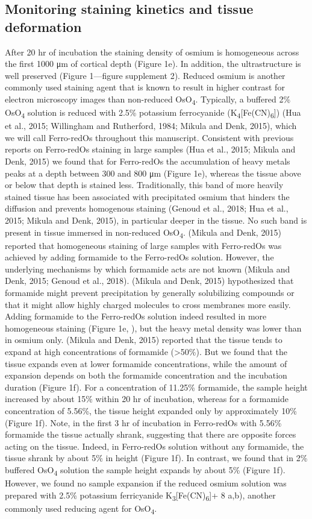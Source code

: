 \documentclass{article}
\begin{document}
\subsection*{Monitoring staining kinetics and tissue deformation}
After 20 hr of incubation the staining density of osmium is homogeneous across the first 1000 μm of cortical depth (Figure 1e). In addition, the ultrastructure is well preserved (Figure 1—figure supplement 2). Reduced osmium is another commonly used staining agent that is known to result in higher contrast for electron microscopy images than non-reduced OsO\textsubscript{4}. Typically, a buffered 2\% OsO\textsubscript{4} solution is reduced with 2.5\% potassium ferrocyanide (K\textsubscript{4}[Fe(CN)\textsubscript{6}]) (Hua et al., 2015; Willingham and Rutherford, 1984; Mikula and Denk, 2015), which we will call Ferro-redOs throughout this manuscript. Consistent with previous reports on Ferro-redOs staining in large samples (Hua et al., 2015; Mikula and Denk, 2015) we found that for Ferro-redOs the accumulation of heavy metals peaks at a depth between 300 and 800 μm (Figure 1e), whereas the tissue above or below that depth is stained less. Traditionally, this band of more heavily stained tissue has been associated with precipitated osmium that hinders the diffusion and prevents homogenous staining (Genoud et al., 2018; Hua et al., 2015; Mikula and Denk, 2015), in particular deeper in the tissue. No such band is present in tissue immersed in non-reduced OsO\textsubscript{4}. (Mikula and Denk, 2015) reported that homogeneous staining of large samples with Ferro-redOs was achieved by adding formamide to the Ferro-redOs solution. However, the underlying mechanisms by which formamide acts are not known (Mikula and Denk, 2015; Genoud et al., 2018). (Mikula and Denk, 2015) hypothesized that formamide might prevent precipitation by generally solubilizing compounds or that it might allow highly charged molecules to cross membranes more easily. Adding formamide to the Ferro-redOs solution indeed resulted in more homogeneous staining (Figure 1e, ), but the heavy metal density was lower than in osmium only. (Mikula and Denk, 2015) reported that the tissue tends to expand at high concentrations of formamide (>50\%). But we found that the tissue expands even at lower formamide concentrations, while the amount of expansion depends on both the formamide concentration and the incubation duration (Figure 1f). For a concentration of 11.25\% formamide, the sample height increased by about 15\% within 20 hr of incubation, whereas for a formamide concentration of 5.56\%, the tissue height expanded only by approximately 10\% (Figure 1f). Note, in the first 3 hr of incubation in Ferro-redOs with 5.56\% formamide the tissue actually shrank, suggesting that there are opposite forces acting on the tissue. Indeed, in Ferro-redOs solution without any formamide, the tissue shrank by about 5\% in height (Figure 1f). In contrast, we found that in 2\% buffered OsO\textsubscript{4} solution the sample height expands by about 5\% (Figure 1f). However, we found no sample expansion if the reduced osmium solution was prepared with 2.5\% potassium ferricyanide K\textsubscript{3}[Fe(CN)\textsubscript{6}]+ 8 a,b), another commonly used reducing agent for OsO\textsubscript{4}.
\end{document}
